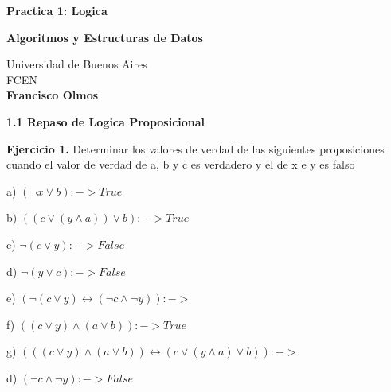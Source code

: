 \documentclass[12pt]{report}
\begin{document}
\begin{titlepage}
    \begin{center}
        \vspace*{1cm}
        
        \Huge
        \textbf{Practica 1: Logica}
        \vspace{0.5cm}
        \LARGE

        \vfill
        \textbf{Algoritmos y Estructuras de Datos}
        

        
        \vfill

        
        \vspace{0.8cm}
        
        \Large
        Universidad de Buenos Aires \\
        FCEN \\
        \textbf{Francisco Olmos}
        
    \end{center}
\end{titlepage}

\textbf{1.1 Repaso de Logica Proposicional}

\vspace{0.8cm}
\textbf{Ejercicio 1.} Determinar los valores de verdad de las siguientes proposiciones cuando el valor de verdad de a, b y c es
verdadero y el de x e y es falso

\vspace{0.8cm}
a) $(\neg x \vee b) :-> True$

\vspace{0.2cm}
b) $((c \vee (y \wedge a)) \vee b) :-> True$

\vspace{0.2cm}
c) $\neg (c \vee y) :-> False$

\vspace{0.2cm}
d) $\neg (y \vee c) :-> False$

\vspace{0.2cm}
e) $(\neg (c \vee y) \leftrightarrow (\neg c \wedge \neg y)) :-> $

\vspace{0.2cm}
f) $((c \vee y) \wedge (a \vee b)) :-> True$

\vspace{0.2cm}
g) $(((c \vee y) \wedge (a \vee b)) \leftrightarrow ( c \vee (y \wedge a) \vee b)) :-> $

\vspace{0.2cm}
d) $(\neg c \wedge \neg y) :-> False$
\end{document}
